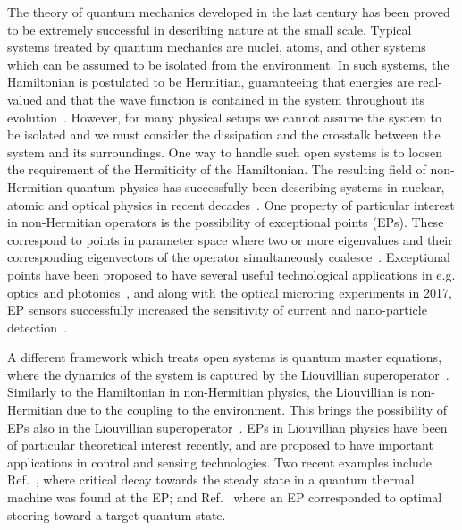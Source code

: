 \documentclass[../main.tex]{subfiles}
\begin{document}
The theory of quantum mechanics developed in the last century has been proved to be extremely successful in describing nature at the small scale. Typical systems treated by quantum mechanics are nuclei, atoms, and other systems which can be assumed to be isolated from the environment. In such systems, the Hamiltonian is postulated to be Hermitian, guaranteeing that energies are real-valued and that the wave function is contained in the system throughout its evolution~\cite{sakurai}. However, for many physical setups we cannot assume the system to be isolated and we must consider the dissipation and the crosstalk between the system and its surroundings. One way to handle such open systems is to loosen the requirement of the Hermiticity of the Hamiltonian. The resulting field of non-Hermitian quantum physics has successfully been describing systems in nuclear, atomic and optical physics in recent decades~\cite{nonHermrev}. One property of particular interest in non-Hermitian operators is the possibility of exceptional points (EPs). These correspond to points in parameter space where two or more eigenvalues and their corresponding eigenvectors of the operator simultaneously coalesce~\cite{ep_expl}. Exceptional points have been proposed to have several useful technological applications in e.g. optics and photonics~\cite{eptechrev1,eptechrev2}, and along with the optical microring experiments in 2017, EP sensors successfully increased the sensitivity of current and nano-particle detection~\cite{microring1, microring2}.

A different framework which treats open systems is quantum master equations, where the dynamics of the system is captured by the Liouvillian superoperator~\cite{bookopen}. Similarly to the Hamiltonian in non-Hermitian physics, the Liouvillian is non-Hermitian due to the coupling to the environment. This brings the possibility of EPs also in the Liouvillian superoperator~\cite{HEPvsLEP}. EPs in Liouvillian physics have been of particular theoretical interest recently, and are proposed to have important applications in control and sensing technologies. Two recent examples include Ref.~\cite{thermal}, where critical decay towards the steady state in a quantum thermal machine was found at the EP; and Ref.~\cite{steering} where an EP corresponded to optimal steering toward a target quantum state. 
\end{document}
